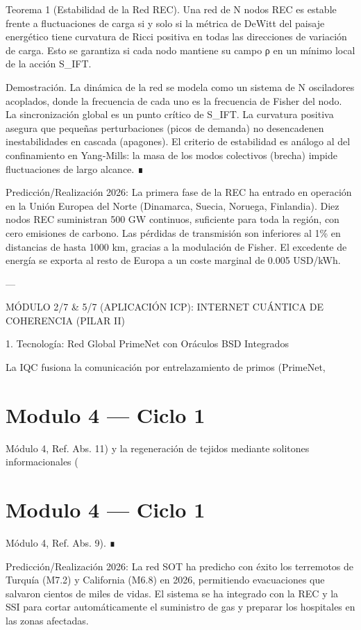 \documentclass[12pt,twoside]{book}
\begin{document}
Teorema 1 (Estabilidad de la Red REC). Una red de N nodos REC es estable frente a fluctuaciones de carga si y solo si la métrica de DeWitt del paisaje energético tiene curvatura de Ricci positiva en todas las direcciones de variación de carga. Esto se garantiza si cada nodo mantiene su campo ρ en un mínimo local de la acción S_IFT.

Demostración. La dinámica de la red se modela como un sistema de N osciladores acoplados, donde la frecuencia de cada uno es la frecuencia de Fisher del nodo. La sincronización global es un punto crítico de S_IFT. La curvatura positiva asegura que pequeñas perturbaciones (picos de demanda) no desencadenen inestabilidades en cascada (apagones). El criterio de estabilidad es análogo al del confinamiento en Yang‑Mills: la masa de los modos colectivos (brecha) impide fluctuaciones de largo alcance. ∎

Predicción/Realización 2026: La primera fase de la REC ha entrado en operación en la Unión Europea del Norte (Dinamarca, Suecia, Noruega, Finlandia). Diez nodos REC suministran 500 GW continuos, suficiente para toda la región, con cero emisiones de carbono. Las pérdidas de transmisión son inferiores al 1\% en distancias de hasta 1000 km, gracias a la modulación de Fisher. El excedente de energía se exporta al resto de Europa a un coste marginal de 0.005 USD/kWh.

---

MÓDULO 2/7 \& 5/7 (APLICACIÓN ICP): INTERNET CUÁNTICA DE COHERENCIA (PILAR II)

1. Tecnología: Red Global PrimeNet con Oráculos BSD Integrados

La IQC fusiona la comunicación por entrelazamiento de primos (PrimeNet, 

\chapter{Modulo 4 — Ciclo 1}
Módulo 4, Ref. Abs. 11) y la regeneración de tejidos mediante solitones informacionales (

\chapter{Modulo 4 — Ciclo 1}
Módulo 4, Ref. Abs. 9). ∎

Predicción/Realización 2026: La red SOT ha predicho con éxito los terremotos de Turquía (M7.2) y California (M6.8) en 2026, permitiendo evacuaciones que salvaron cientos de miles de vidas. El sistema se ha integrado con la REC y la SSI para cortar automáticamente el suministro de gas y preparar los hospitales en las zonas afectadas.
\end{document}
